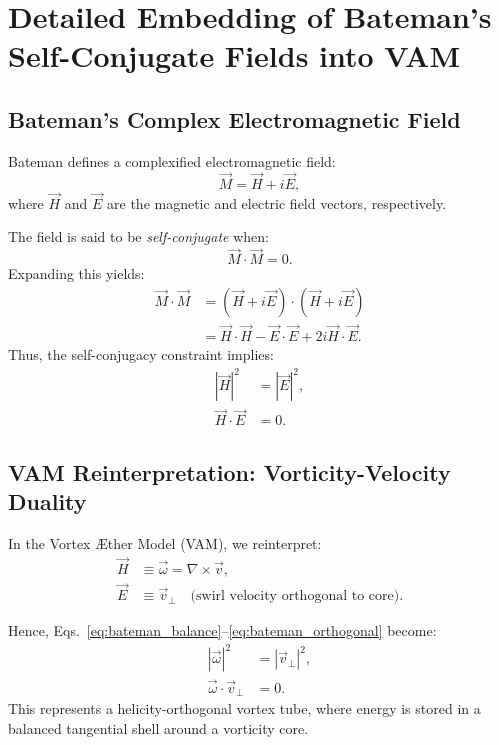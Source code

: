 \section{Detailed Embedding of Bateman's Self-Conjugate Fields into VAM}
\label{appendix:bateman_vam}

\subsection*{Bateman's Complex Electromagnetic Field}

Bateman defines a complexified electromagnetic field:\cite{bateman1915aether}
\begin{equation}
    \vec{M} = \vec{H} + i\vec{E},
\end{equation}
where $\vec{H}$ and $\vec{E}$ are the magnetic and electric field vectors, respectively.

The field is said to be \textit{self-conjugate} when:
\begin{equation}
    \vec{M} \cdot \vec{M} = 0. \label{eq:bateman_self_conj}
\end{equation}
Expanding this yields:\cite{bateman1915aether}
\begin{align}
    \vec{M} \cdot \vec{M} &= (\vec{H} + i\vec{E}) \cdot (\vec{H} + i\vec{E}) \\
    &= \vec{H} \cdot \vec{H} - \vec{E} \cdot \vec{E} + 2i \vec{H} \cdot \vec{E}.
\end{align}
Thus, the self-conjugacy constraint implies:
\begin{align}
    |\vec{H}|^2 &= |\vec{E}|^2, \label{eq:bateman_balance} \\
    \vec{H} \cdot \vec{E} &= 0. \label{eq:bateman_orthogonal}
\end{align}

\subsection{VAM Reinterpretation: Vorticity-Velocity Duality}

In the Vortex Æther Model (VAM), we reinterpret:\cite{iskandarani2025swirlgravity}
\begin{align*}
    \vec{H} &\equiv \vec{\omega} = \nabla \times \vec{v}, \\
    \vec{E} &\equiv \vec{v}_\perp \quad \text{(swirl velocity orthogonal to core)}.
\end{align*}

Hence, Eqs.~\eqref{eq:bateman_balance}--\eqref{eq:bateman_orthogonal} become:
\begin{align}
    |\vec{\omega}|^2 &= |\vec{v}_\perp|^2, \label{eq:vam_balance} \\
    \vec{\omega} \cdot \vec{v}_\perp &= 0. \label{eq:vam_orthogonal}
\end{align}
This represents a helicity-orthogonal vortex tube, where energy is stored in a balanced tangential shell around a vorticity core.

